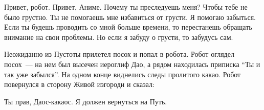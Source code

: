 \begin{dialog}
\X Привет, робот.
\R Привет, Аниме. Почему ты преследуешь меня?
\X Чтобы тебе не было грустно.
\R Ты не помогаешь мне избавиться от грусти.
\X Я помогаю забыться. Если ты будешь проводить со мной больше времени, то перестанешь обращать внимание на свои проблемы.
\R Но если я забуду о грусти, то забудусь сам.
\end{dialog}

\begin{monolog}
Неожиданно из Пустоты прилетел посох и попал в робота. Робот оглядел посох~--- на нем был высечен иероглиф Дао, а рядом находилась приписка “Ты и так уже забылся”. На одном конце виднелись следы пролитого какао. Робот повернулся в сторону Живой изгороди и сказал:
\end{monolog}

\begin{dialog}
\R Ты прав, Даос-какаос. Я должен вернуться на Путь.
\end{dialog}